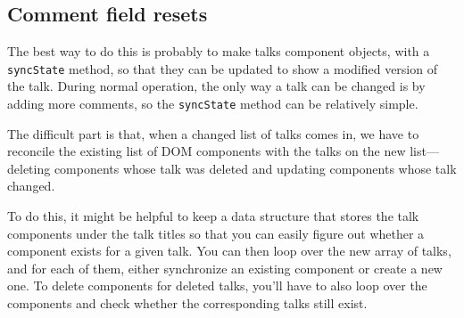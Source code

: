 \subsection{Comment field resets}

The best way to do this is probably to make talks component objects, with a \lstinline`syncState` method, so that they can be updated to show a modified version of the talk. During normal operation, the only way a talk can be changed is by adding more comments, so the \lstinline`syncState` method can be relatively simple.

The difficult part is that, when a changed list of talks comes in, we have to reconcile the existing list of DOM components with the talks on the new list—deleting components whose talk was deleted and updating components whose talk changed.

To do this, it might be helpful to keep a data structure that stores the talk components under the talk titles so that you can easily figure out whether a component exists for a given talk. You can then loop over the new array of talks, and for each of them, either synchronize an existing component or create a new one. To delete components for deleted talks, you'll have to also loop over the components and check whether the corresponding talks still exist.
